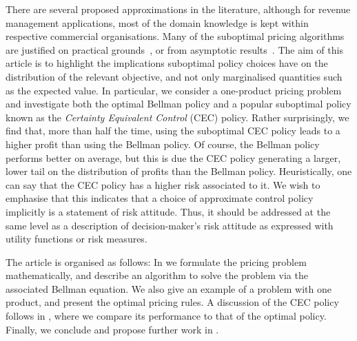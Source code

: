 \documentclass[main.tex]{subfiles}
\begin{document}
There are several proposed approximations in the
literature, although for revenue management applications, most of the domain knowledge is kept within
respective commercial organisations.
Many of the suboptimal pricing algorithms are justified on practical
grounds~\cite{aviv2012dynamic}, or
from asymptotic results~\cite{gallego1994optimal}.
The aim of this article is to highlight the implications suboptimal policy
choices have on the distribution of the relevant objective, and not
only marginalised quantities such as the expected value.
In particular, we consider a one-product pricing problem and
investigate both the optimal Bellman policy and a popular suboptimal
policy known as the \emph{Certainty Equivalent Control} (CEC)
policy.
Rather surprisingly, we find that, more than half the
time, using the suboptimal CEC policy
leads to a higher profit than using the Bellman policy. Of course, the
Bellman policy performs better on average, but
this is due the CEC policy generating a larger, lower tail on the
distribution of profits than the Bellman policy.
Heuristically, one can say that the CEC policy has a higher risk
associated to it. We wish to emphasise that this indicates that a
choice of approximate control policy implicitly is a statement of
risk attitude. Thus, it should be addressed at the same level as a
description of decision-maker's risk attitude as expressed with
utility functions or risk measures.


The article is organised as follows:
In  we formulate the
pricing problem mathematically, and describe an algorithm to solve the
problem via the associated Bellman equation. We also give an example
of a problem with one product, and present the optimal pricing rules.
A discussion of the CEC policy follows in
, where we compare its
performance to that of
the optimal policy.
Finally, we conclude and propose further work in .

\biblio
\end{document}
